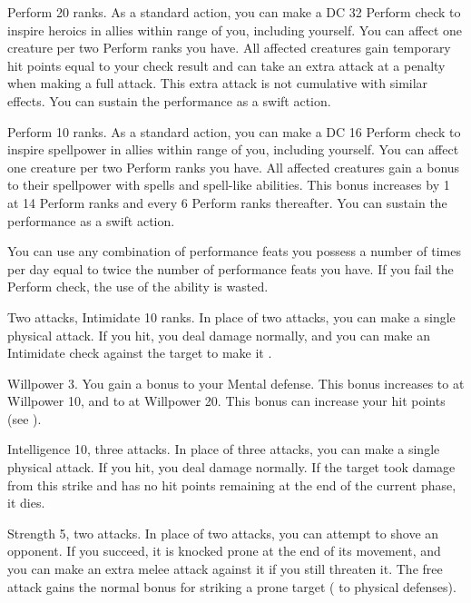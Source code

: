 \featpre Perform 20 ranks.
\featben As a standard action, you can make a DC 32 Perform check to inspire heroics in allies within \rngmed range of you, including yourself.
You can affect one creature per two Perform ranks you have.
All affected creatures gain temporary hit points equal to your check result and can take an extra attack at a  penalty when making a full attack.
This extra attack is not cumulative with similar effects.
You can sustain the performance as a swift action.

\featpre Perform 10 ranks.
\featben As a standard action, you can make a DC 16 Perform check to inspire spellpower in allies within \rngmed range of you, including yourself.
You can affect one creature per two Perform ranks you have.
All affected creatures gain a  bonus to their spellpower with spells and spell-like abilities.
This bonus increases by 1 at 14 Perform ranks and every 6 Perform ranks thereafter.
You can sustain the performance as a swift action.

You can use any combination of performance feats you possess a number of times per day equal to twice the number of performance feats you have.
If you fail the Perform check, the use of the ability is wasted.

\featpres Two attacks, Intimidate 10 ranks.
\featben In place of two attacks, you can make a single physical attack.
If you hit, you deal damage normally, and you can make an Intimidate check against the target to make it \shaken.

\featpre Willpower 3.
\featben You gain a  bonus to your Mental defense.
This bonus increases to  at Willpower 10, and to  at Willpower 20.
This bonus can increase your hit points (see ).

\featpre Intelligence 10, three attacks.
\featben In place of three attacks, you can make a single physical attack.
If you hit, you deal damage normally.
If the target took damage from this strike and has no hit points remaining at the end of the current phase, it dies.

\featpre Strength 5, two attacks.
\featben In place of two attacks, you can attempt to shove an opponent.
If you succeed, it is knocked prone at the end of its movement, and you can make an extra melee attack against it if you still threaten it.
The free attack gains the normal bonus for striking a prone target ( to physical defenses).

